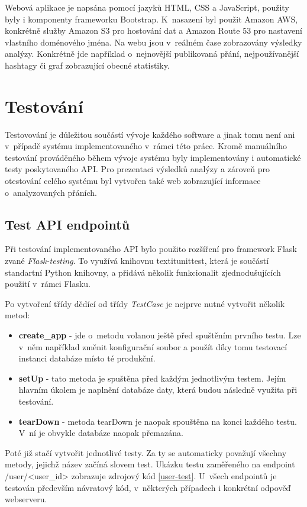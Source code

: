 \documentclass[thesis=B,czech]{FITthesis}[2012/06/26]
\begin{document}
	Webová aplikace je napsána pomocí jazyků HTML, CSS a JavaScript, použity byly i komponenty frameworku Bootstrap. K~nasazení byl použit Amazon AWS, konkrétně služby Amazon S3 pro hostování dat a Amazon Route 53 pro nastavení vlastního doménového jména. Na webu jsou v~reálném čase zobrazovány výsledky analýzy. Konkrétně jde například o~nejnovější publikovaná přání, nejpoužívanější hashtagy či graf zobrazující obecné statistiky. 


\chapter{Testování}
\label{testovani}
Testovování je důležitou součástí vývoje každého software a jinak tomu není ani v~případě systému implementovaného v~rámci této práce. Kromě manuálního testování prováděného během vývoje systému byly implementovány i automatické testy poskytovaného API. Pro prezentaci výsledků analýzy a zároveň pro otestování celého systému byl vytvořen také web zobrazující informace o~analyzovaných přáních. 


\section{Test API endpointů}
\label{api-testing}
Při testování implementovaného API bylo použito rozšíření pro framework Flask zvané \textit{Flask-testing}. To využívá knihovnu textit{unittest}, která je součástí standartní Python knihovny, a přidává několik funkcionalit zjednodušujících použití v~rámci Flasku. 

Po vytvoření třídy dědící od třídy \textit{TestCase} je nejprve nutné vytvořit několik metod:

\begin{itemize}
\item \textbf{create\_app} - jde o~metodu volanou ještě před spuštěním prvního testu. Lze v~něm například změnit konfigurační soubor a použít díky tomu testovací instanci databáze místo té produkční. 
\item \textbf{setUp} - tato metoda je spuštěna před každým jednotlivým testem. Jejím hlavním úkolem je naplnění databáze daty, která budou následně využita při testování. 
\item \textbf{tearDown} - metoda tearDown je naopak spouštěna na konci každého testu. V~ní je obvykle databáze naopak přemazána. 
\end{itemize}

Poté již stačí vytvořit jednotlivé testy. Za ty se automaticky považují všechny metody, jejichž název začíná slovem test. Ukázku testu zaměřeného na endpoint /user/<user\_id> zobrazuje zdrojový kód \ref{user-test}. U~všech endpointů je testován především návratový kód, v~některých případech i konkrétní odpověď webserveru. 
\end{document}

